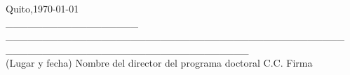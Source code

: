 \documentclass[a4paper,12pt]{article}
\begin{document}
	\begin{flushleft}
 	Quito,\today\\
 	\_\_\_\_\_\_\_\_\_\_\_\_\_\_\_\_\_\_\hspace{0.1cm} \_\_\_\_\_\_\_\_\_\_\_\_\_\_\_\_\_\_\_\_\_\_\_\_\_\_\_\_\_\_\_\_\_\_\_\_\_\_\_\_\_\_\_\_\_\_  \hspace{0.3cm}\_\_\_\_\_\_\_\_\_\_\_\_\_\_\_\_\_\hspace{0.1cm}\_\_\_\_\_\_\_\_\_\_\_\_\_\_\_\_\\
		(Lugar y fecha) \hspace{0.0cm} Nombre del director del programa doctoral \hspace{1.3cm} C.C.\hspace{1cm} \hspace{0.1cm} Firma \\
	\end{flushleft}
	
%		
%	
	
\end{document}
